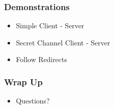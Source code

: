 \documentclass[t]{beamer}
\begin{document}
\begin{frame}
\frametitle{Demonstrations}
\begin{itemize}
\pause
    \item Simple Client - Server
\pause
    \item Secret Channel Client - Server
\pause
    \item Follow Redirects
\end{itemize}
\end{frame}


\begin{frame}
\frametitle{Wrap Up}
\begin{itemize}
\pause
    \item Questions?
\end{itemize}
\end{frame}
\end{document}
